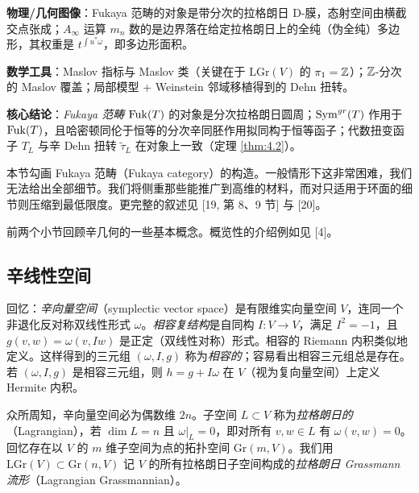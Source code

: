 \begin{keytakeaways}
  \item \textbf{物理/几何图像}：Fukaya 范畴的对象是带分次的拉格朗日 D-膜，态射空间由横截交点张成；$A_\infty$ 运算 $m_n$ 数的是边界落在给定拉格朗日上的全纯（伪全纯）多边形，其权重是 $t^{\int u^*\omega}$，即多边形面积。
  \item \textbf{数学工具}：Maslov 指标与 Maslov 类（关键在于 $\mathrm{LGr}(V)$ 的 $\pi_1=\mathbb{Z}$）；$\mathbb{Z}$-分次的 Maslov 覆盖；局部模型 + Weinstein 邻域移植得到的 Dehn 扭转。
  \item \textbf{核心结论}：\emph{Fukaya 范畴} $\operatorname{Fuk}(T)$ 的对象是分次拉格朗日圆周；$\operatorname{Sym}^{gr}(T)$ 作用于 $\operatorname{Fuk}(T)$，且哈密顿同伦于恒等的分次辛同胚作用拟同构于恒等函子；代数扭变函子 $T_L$ 与辛 Dehn 扭转 $\tilde\tau_L$ 在对象上一致（定理 \ref{thm:4.2}）。
\end{keytakeaways}

本节勾画 Fukaya 范畴（Fukaya category）的构造。一般情形下这非常困难，我们无法给出全部细节。我们将侧重那些能推广到高维的材料，而对只适用于环面的细节则压缩到最低限度。更完整的叙述见 [19, 第 8、9 节] 与 [20]。

前两个小节回顾辛几何的一些基本概念。概览性的介绍例如见 [4]。

\subsection{辛线性空间}
\label{subsec:sympl-linear}

回忆：\emph{辛向量空间}（symplectic vector space）是有限维实向量空间 $V$，连同一个非退化反对称双线性形式 $\omega$。\emph{相容复结构}是自同构 $I: V\to V$，满足 $I^2=-1$，且 $g(v,w)=\omega(v,Iw)$ 是正定（双线性对称）形式。相容的 Riemann 内积类似地定义。这样得到的三元组 $(\omega,I,g)$ 称为\emph{相容的}；容易看出相容三元组总是存在。若 $(\omega,I,g)$ 是相容三元组，则 $h=g+I\omega$ 在 $V$（视为复向量空间）上定义 Hermite 内积。


众所周知，辛向量空间必为偶数维 $2n$。子空间 $L\subset V$ 称为\emph{拉格朗日的}（Lagrangian），若 $\dim L=n$ 且 $\omega|_L=0$，即对所有 $v,w\in L$ 有 $\omega(v,w)=0$。回忆存在以 $V$ 的 $m$ 维子空间为点的拓扑空间 $\mathrm{Gr}(m,V)$。我们用 $\mathrm{LGr}(V)\subset\mathrm{Gr}(n,V)$ 记 $V$ 的所有拉格朗日子空间构成的\emph{拉格朗日 Grassmann 流形}（Lagrangian Grassmannian）。

